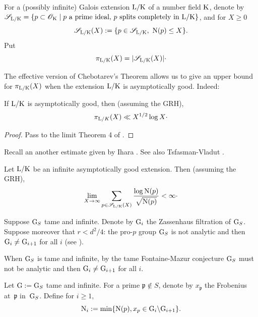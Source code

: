 \documentclass[12pt,a4paper,twoside,english]{smfart}
\def\p{{\mathfrak p}}
\def\N{{\rm N}}
\def\G{{\rm G}}
\def\K{{\rm K}}
\def\L{{\rm L}}
\def\O{{\mathcal O}}
\def\SS{{\mathcal S}}
\begin{document}
\begin{defi}
For a (possibly infinite) Galois extension  $\L/\K$ of a number field $\K$, denote by 
$\SS_{\L/\K}=\{  \p \subset \O_\K \mid  \p \ {\rm a \ prime \ ideal,} \ \p  {\rm \ splits \ completely \ in  \ } \L/\K\}$, and for $X \geq 0$
 $$\displaystyle{\SS_{\L/\K}(X):= \{\p \in \SS_{\L/\K}, \ \N(\p)\leq X\}}.$$
Put
$$\pi_{\L/\K}(X)=|\SS_{\L/\K}(X)| \cdot$$
\end{defi}


The effective version of Chebotarev's Theorem allows us to  give an upper bound for  $\pi_{\L/\K}(X)$ when the extension
 $\L/\K$ is asymptotically good. Indeed:

\begin{prop}
If  $\L/\K$ is asymptotically good, then (assuming the  GRH), 
$$\pi_{\L/K}(X) \ll X^{1/2}\log X \cdot$$ 
\end{prop}

\begin{proof}
Pass to the limit  Theorem 4 of \cite[\S 2.4]{Serre}.
\end{proof}

Recall an another  estimate given by   Ihara \cite{Ihara}. See also Tsfasman-Vladut \cite{TV}.



\begin{theo} \label{theo-Ihara}
Let $\L/\K$ be an infinite asymptotically good extension. Then (assuming the GRH), 
 $$\lim_{X \rightarrow \infty} \sum_{\p \in \SS_{\L/\K}(X)}\frac{\log \N(\p)}{\sqrt{\N(\p)}}   < \infty \cdot$$
\end{theo}




Suppose $\G_S$ tame and  infinite. Denote by $\G_i$ the Zassenhaus filtration of $\G_S$. Suppose moreover that  $r<d^2/4$: the pro-$p$ group $\G_S$ is  not analytic and  then $\G_i \neq \G_{i+1}$ for all $i$ (see \cite[Chapter 11, Theorem 11.4]{DSMN}). 

\begin{rema} When $\G_S$ is tame and infinite,  by the tame Fontaine-Mazur conjecture \cite[Conjecture (5a)]{FM} $\G_S$ must not be  analytic and then $\G_i \neq \G_{i+1}$ for all $i$.
\end{rema} 


\begin{defi} Let  $\G:=\G_S$ tame and infinite. For a prime $\p \notin S$, denote by  $x_\p$ the Frobenius at~$\p$ in~$\G_S$.
Define for $i\geq 1$, $$\N_i:=\min \{\N(\p), x_\p \in \G_i\backslash \G_{i+1} \}.$$
\end{defi}
\end{document}
